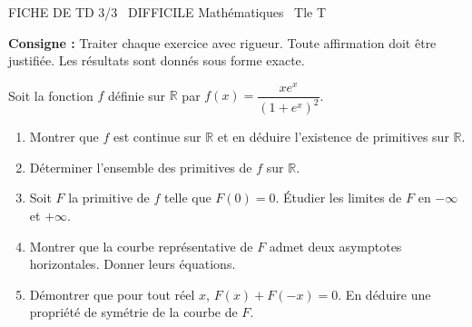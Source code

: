 \documentclass[11pt]{article}
\begin{document}
\begin{tcolorbox}[enhanced,colback=popink,colframe=popink,arc=10pt,boxrule=0pt,left=12pt,right=12pt,top=9pt,bottom=9pt]
{\color{white}\popxbold\small FICHE DE TD 3/3 \textbullet\ DIFFICILE \hfill Mathématiques \textbullet\ Tle T\par}
\end{tcolorbox}
\vspace{4pt}
\noindent \textbf{Consigne :} Traiter chaque exercice avec rigueur. Toute affirmation doit être justifiée. Les résultats sont donnés sous forme exacte.

\begin{exercice}
Soit la fonction $f$ définie sur $\mathbb{R}$ par $f(x) = \dfrac{x e^x}{(1+e^x)^2}$.
\begin{enumerate}
    \item Montrer que $f$ est continue sur $\mathbb{R}$ et en déduire l'existence de primitives sur $\mathbb{R}$.
    \item Déterminer l'ensemble des primitives de $f$ sur $\mathbb{R}$.
    \item Soit $F$ la primitive de $f$ telle que $F(0) = 0$. Étudier les limites de $F$ en $-\infty$ et $+\infty$.
    \item Montrer que la courbe représentative de $F$ admet deux asymptotes horizontales. Donner leurs équations.
    \item Démontrer que pour tout réel $x$, $F(x) + F(-x) = 0$. En déduire une propriété de symétrie de la courbe de $F$.
\end{enumerate}
\end{exercice}
\end{document}
